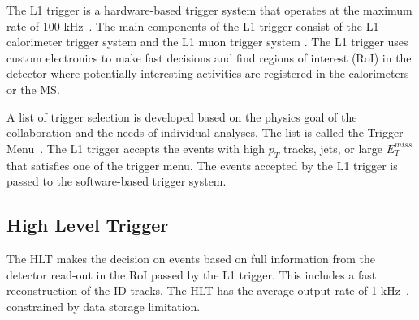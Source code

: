 The L1 trigger is a hardware-based trigger system that operates at the maximum rate of 100 \si{\kilo\hertz}~\cite{1742-6596-762-1-012003}. The main components of the L1 trigger consist of the L1 calorimeter trigger system and the L1 muon trigger system . The L1 trigger uses custom electronics to make fast decisions and find regions of interest (RoI) in the detector where potentially interesting activities are registered in the calorimeters or the MS.

A list of trigger selection is developed based on the physics goal of the collaboration and the needs of individual analyses. The list is called the Trigger Menu~\cite{VazquezSchroeder:2287548}. The L1 trigger accepts the events with high $p_{T}$ tracks, jets, or large $E_{T}^{miss}$ that satisfies one of the trigger menu. The events accepted by the L1 trigger is passed to the software-based trigger system.


\subsection{High Level Trigger}
\label{sec:atlas:hlt}

The HLT makes the decision on events based on full information from the detector read-out in the RoI passed by the L1 trigger. This includes a fast reconstruction of the ID tracks. The HLT has the average output rate of 1 \si{\kilo\hertz}~\cite{1742-6596-762-1-012003}, constrained by data storage limitation. 


